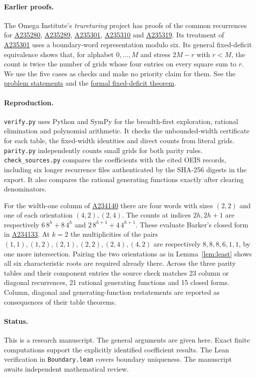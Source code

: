 \documentclass[11pt,letterpaper]{article}
\newcommand{\seqid}[1]{\href{https://oeis.org/A#1}{A#1}}
\begin{document}
\paragraph{Earlier proofs.}
The Omega Institute's \emph{trureturing} project has proofs of the common recurrences for
\seqid{235280}, \seqid{235289}, \seqid{235301}, \seqid{235310} and \seqid{235319}.
Its treatment of \seqid{235301} uses a boundary-word representation modulo six.
Its general fixed-deficit equivalence shows that, for alphabet $0,\ldots,M$ and stress $2M-r$ with $r<M$, the count is twice the number of grids whose four entries on every square sum to $r$. We use the five cases as checks and make no priority claim for them.
See the
\href{https://github.com/the-omega-institute/trureturing/tree/9ccf7e999d9d317777dacc48da28169af2c994e6/Problems}{problem statements}
and the
\href{https://github.com/the-omega-institute/trureturing/blob/9ccf7e999d9d317777dacc48da28169af2c994e6/D5/S3/Combinatorics/TraceAvoidingArrays/Recurrence/HardinA235280A235310Alphabet.lean}{formal fixed-deficit theorem}.

\paragraph{Reproduction.}
\texttt{verify.py} uses Python and SymPy for the breadth-first exploration, rational elimination and polynomial arithmetic. It checks the unbounded-width certificate for each table, the fixed-width identities and direct counts from literal grids. \texttt{parity.py} independently counts small grids for both parity rules. \texttt{check\_sources.py} compares the coefficients with the cited OEIS records, including six longer recurrence files authenticated by the SHA-256 digests in the export. It also compares the rational generating functions exactly after clearing denominators.

For the width-one column of \seqid{234140} there are four words with sizes $(2,2)$ and one of each orientation $(4,2),(2,4)$. The counts at indices $2h,2h+1$ are respectively $6\,8^h+8\,4^h$ and $2\,8^{h+1}+4\,4^{h+1}$. These evaluate Barker's closed form in \seqid{234133}. At $k=2$ the multiplicities of the pairs $(1,1),(1,2),(2,1),(2,2),(2,4),(4,2)$ are respectively $8,8,8,6,1,1$, by one more intersection. Pairing the two orientations as in Lemma~\ref{lem:least} shows all six characteristic roots are required already there. Across the three parity tables and their component entries the source check matches 23 column or diagonal recurrences, 21 rational generating functions and 15 closed forms. Column, diagonal and generating-function restatements are reported as consequences of their table theorems.

\paragraph{Status.}
This is a research manuscript. The general arguments are given here. Exact finite computations support the explicitly identified coefficient results. The Lean verification in \texttt{Boundary.lean} covers boundary uniqueness. The manuscript awaits independent mathematical review.
\end{document}
